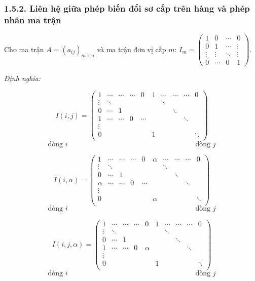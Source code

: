 \subsubsection*{1.5.2. Liên hệ giữa phép biến đổi sơ cấp trên hàng và phép nhân ma trận}
Cho ma trận \( A = (a_{ij})_{m \times n} \) và ma trận đơn vị cấp \( m \): \( I_m = \begin{pmatrix}
1 & 0 & \cdots & 0 \\
0 & 1 & \cdots & \vdots \\
\vdots & \vdots & \ddots & \vdots \\
0 & \cdots & 0 & 1
\end{pmatrix} \).

\textit{Định nghĩa:}

\[
I(i, j) = \begin{pmatrix}
1 & \cdots & \cdots & \cdots & 0 & 1 & \cdots & \cdots & \cdots & 0 \\
\vdots & \ddots & & & & & \ddots & & & \\
0 & \cdots & 1 & & & & & \ddots & & \\
1 & \cdots & \cdots & 0 & \cdots & & & & \ddots & \\
\vdots & & & & & & & & & \\
0 & & & & & 1 & & & & \ddots \\
\end{pmatrix} 
\]
\[
\text{dòng } i \quad \quad \quad \quad \quad \quad \quad \quad \quad \quad \quad \quad \quad \quad \quad \quad \quad \quad \text{dòng } j
\]

\[
I(i, \alpha) = \begin{pmatrix}
1 & \cdots & \cdots & \cdots & 0 & \alpha & \cdots & \cdots & \cdots & 0 \\
\vdots & \ddots & & & & & \ddots & & & \\
0 & \cdots & 1 & & & & & \ddots & & \\
\alpha & \cdots & \cdots & 0 & \cdots & & & & \ddots & \\
\vdots & & & & & & & & & \\
0 & & & & & \alpha & & & & \ddots \\
\end{pmatrix} 
\]
\[
\text{dòng } i \quad \quad \quad \quad \quad \quad \quad \quad \quad \quad \quad \quad \quad \quad \quad \quad \quad \quad \text{dòng } j
\]

\[
I(i, j, \alpha) = \begin{pmatrix}
1 & \cdots & \cdots & \cdots & 0 & 1 & \cdots & \cdots & \cdots & 0 \\
\vdots & \ddots & & & & & \ddots & & & \\
0 & \cdots & 1 & & & & & \ddots & & \\
1 & \cdots & \cdots & 0 & \alpha & & & & \ddots & \\
\vdots & & & & & & & & & \\
0 & & & & & 1 & & & & \ddots \\
\end{pmatrix} 
\]
\[
\text{dòng } i \quad \quad \quad \quad \quad \quad \quad \quad \quad \quad \quad \quad \quad \quad \quad \quad \quad \quad \text{dòng } j
\]

